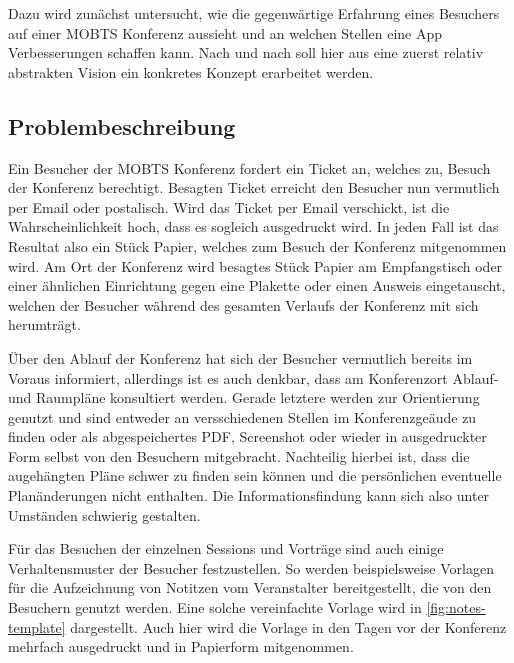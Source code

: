 Dazu wird zunächst untersucht, wie die gegenwärtige Erfahrung eines Besuchers auf einer \ac{MOBTS} Konferenz aussieht und an welchen Stellen eine App Verbesserungen schaffen kann.
Nach und nach soll hier aus eine zuerst relativ abstrakten Vision ein konkretes Konzept erarbeitet werden.

\subsection{Problembeschreibung}
Ein Besucher der \ac{MOBTS} Konferenz fordert ein Ticket an, welches zu, Besuch der Konferenz berechtigt.
Besagten Ticket erreicht den Besucher nun vermutlich per Email oder postalisch.
Wird das Ticket per Email verschickt, ist die Wahrscheinlichkeit hoch, dass es sogleich ausgedruckt wird.
In jeden Fall ist das Resultat also ein Stück Papier, welches zum Besuch der Konferenz mitgenommen wird.
Am Ort der Konferenz wird besagtes Stück Papier am Empfangstisch oder einer ähnlichen Einrichtung gegen eine Plakette oder einen Ausweis eingetauscht, welchen der Besucher während des gesamten Verlaufs der Konferenz mit sich herumträgt.

Über den Ablauf der Konferenz hat sich der Besucher vermutlich bereits im Voraus informiert, allerdings ist es auch denkbar, dass am Konferenzort Ablauf- und Raumpläne konsultiert werden. 
Gerade letztere werden zur Orientierung genutzt und sind entweder an versschiedenen Stellen im Konferenzgeäude zu finden oder als abgespeichertes PDF, Screenshot oder wieder in ausgedruckter Form selbst von den Besuchern mitgebracht.
Nachteilig hierbei ist, dass die augehängten Pläne schwer zu finden sein können und die persönlichen eventuelle Planänderungen nicht enthalten.
Die Informationsfindung kann sich also unter Umständen schwierig gestalten.

Für das Besuchen der einzelnen Sessions und Vorträge sind auch einige Verhaltensmuster der Besucher festzustellen.
So werden beispielsweise Vorlagen für die Aufzeichnung von Notitzen vom Veranstalter bereitgestellt, die von den Besuchern genutzt werden.
Eine solche vereinfachte Vorlage wird in \autoref{fig:notes-template} dargestellt.
Auch hier wird die Vorlage in den Tagen vor der Konferenz mehrfach ausgedruckt und in Papierform mitgenommen.

